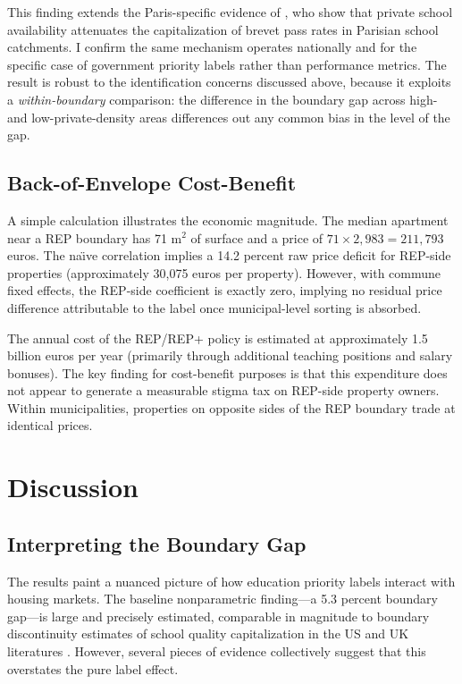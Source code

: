 \documentclass[12pt]{article}
\begin{document}
This finding extends the Paris-specific evidence of \citet{fack2010}, who show that private school availability attenuates the capitalization of brevet pass rates in Parisian school catchments. I confirm the same mechanism operates nationally and for the specific case of government priority labels rather than performance metrics. The result is robust to the identification concerns discussed above, because it exploits a \textit{within-boundary} comparison: the difference in the boundary gap across high- and low-private-density areas differences out any common bias in the level of the gap.

\subsection{Back-of-Envelope Cost-Benefit}

A simple calculation illustrates the economic magnitude. The median apartment near a REP boundary has 71 m$^2$ of surface and a price of $71 \times 2{,}983 = 211{,}793$ euros. The na\"{\i}ve correlation implies a 14.2 percent raw price deficit for REP-side properties (approximately 30,075 euros per property). However, with commune fixed effects, the REP-side coefficient is exactly zero, implying no residual price difference attributable to the label once municipal-level sorting is absorbed.

The annual cost of the REP/REP+ policy is estimated at approximately 1.5 billion euros per year (primarily through additional teaching positions and salary bonuses). The key finding for cost-benefit purposes is that this expenditure does not appear to generate a measurable stigma tax on REP-side property owners. Within municipalities, properties on opposite sides of the REP boundary trade at identical prices.


\section{Discussion}\label{sec:discussion}

\subsection{Interpreting the Boundary Gap}

The results paint a nuanced picture of how education priority labels interact with housing markets. The baseline nonparametric finding---a 5.3 percent boundary gap---is large and precisely estimated, comparable in magnitude to boundary discontinuity estimates of school quality capitalization in the US and UK literatures \citep{black1999, gibbons2013}. However, several pieces of evidence collectively suggest that this overstates the pure label effect.
\end{document}
